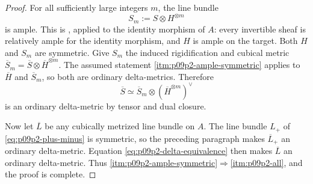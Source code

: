 \begin{proof}
For all sufficiently large integers \(m\), the line bundle
\begin{equation}
\label{eq:p09p2-ample-twist}
                         S_m:=S\otimes H^{\otimes m}
\end{equation}
is ample.  This is
\cite[Lemma~29.38.7, Tag~0892]{stacks-project}, applied to the identity
morphism of \(A\): every invertible sheaf is relatively ample for the
identity morphism, and \(H\) is ample on the target.  Both \(H\) and \(S_m\)
are symmetric.  Give \(S_m\) the induced rigidification and cubical metric
\(\overline S_m=\overline S\otimes\overline H^{\otimes m}\).  The assumed
statement \cref{itm:p09p2-ample-symmetric} applies to \(\overline H\) and
\(\overline S_m\), so both are ordinary delta-metrics.  Therefore
\[
          \overline S
          \simeq
          \overline S_m\otimes
          (\overline H^{\otimes m})^\vee
\]
is an ordinary delta-metric by tensor and dual closure.

Now let \(\overline L\) be any cubically metrized line bundle on \(A\).
The line bundle \(L_+\) of \eqref{eq:p09p2-plus-minus} is symmetric, so the
preceding paragraph makes \(\overline L_+\) an ordinary delta-metric.
Equation \eqref{eq:p09p2-delta-equivalence} then makes \(\overline L\) an
ordinary delta-metric.  Thus
\cref{itm:p09p2-ample-symmetric}\(\Rightarrow\)\cref{itm:p09p2-all}, and
the proof is complete.
\end{proof}
